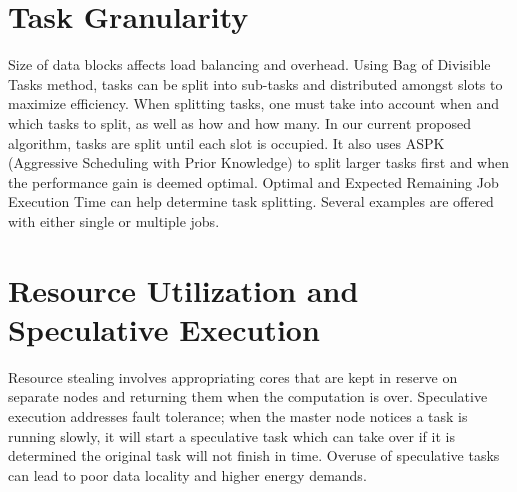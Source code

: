 

\section{Task Granularity}

Size of data blocks affects load balancing and overhead. Using Bag of
Divisible Tasks method, tasks can be split into sub-tasks and
distributed amongst slots to maximize efficiency. When splitting tasks,
one must take into account when and which tasks to split, as well as how
and how many. In our current proposed algorithm, tasks are split until
each slot is occupied. It also uses ASPK (Aggressive Scheduling with
Prior Knowledge) to split larger tasks first and when the performance
gain is deemed optimal. Optimal and Expected Remaining Job Execution
Time can help determine task splitting. Several examples are offered
with either single or multiple jobs.



\section{Resource Utilization and Speculative Execution}

Resource stealing involves appropriating cores that are kept in reserve
on separate nodes and returning them when the computation is over.
Speculative execution addresses fault tolerance; when the master node
notices a task is running slowly, it will start a speculative task which
can take over if it is determined the original task will not finish in
time. Overuse of speculative tasks can lead to poor data locality and
higher energy demands.


